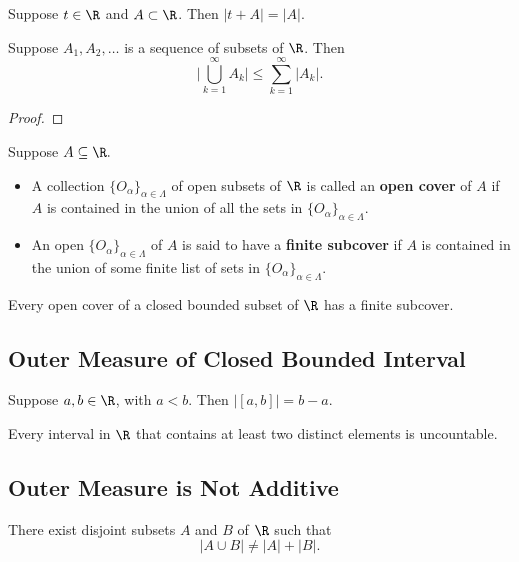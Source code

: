 \begin{prop}
    Suppose \( t \in \R  \) and \( A \subset \R  \). Then \( | t + A  |  = | A  |  \).
\end{prop}


\begin{prop}
    Suppose \( {A}_{1}, {A}_{2}, \dots  \) is a sequence of subsets of \( \R  \). Then
    \[  \Big| \bigcup_{ k=1  }^{ \infty  }  {A}_{k }  \Big|  \leq \sum_{ k=1  }^{ \infty  } | {A}_{k } |. \]
\end{prop}
\begin{proof}

\end{proof}

\begin{definition}
    Suppose \( A \subseteq  \R .  \)    
    \begin{itemize}
        \item A collection \( \{  {O}_{\alpha} \}_{\alpha \in \Lambda} \) of open subsets of \( \R  \) is called an \textbf{open cover} of \( A  \) if \( A  \) is contained in the union of all the sets in \( \{ {O}_{\alpha} \}_{\alpha \in \Lambda} \).
        \item An open \( \{ {O}_{\alpha} \}_{\alpha \in \Lambda} \) of \( A  \) is said to have a \textbf{finite subcover} if \( A  \) is contained in the union of some finite list of sets in \( \{ {O}_{\alpha} \}_{\alpha \in \Lambda}\).
    \end{itemize}
\end{definition}

\begin{prop}
Every open cover of a closed bounded subset of \( \R  \) has a finite subcover.
\end{prop}


\subsection{Outer Measure of Closed Bounded Interval}


\begin{prop}
    Suppose \( a,b \in \R  \), with \( a < b  \). Then \( | [a,b] |  = b - a  \). 
\end{prop}

\begin{prop}
    Every interval in \( \R  \) that contains at least two distinct elements is uncountable.
\end{prop}


\subsection{Outer Measure is Not Additive}

\begin{prop}
    There exist disjoint subsets \( A  \) and \( B  \) of \( \R  \) such that
    \[  | A \cup B  |  \neq | A  |  + | B  |. \]
\end{prop}
